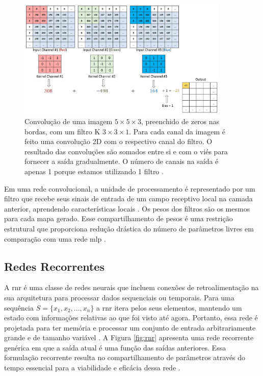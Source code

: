 \begin{figure}[h]
	\centering
	\includegraphics[width=0.9\textwidth]{figuras/conv3D.pdf}
	\caption[Convolução 2D em três mapa de recurso.]{Convolução de uma imagem  $5 \times 5 \times 3$, preenchido de zeros nas bordas, com um filtro K $3 \times 3 \times 1$. Para cada canal da imagem é feito uma convolução 2D com o respectivo canal do filtro. O resultado das convoluções são somados entre si e com o viés para fornecer a saída gradualmente.  O número de canais na saída é apenas 1 porque estamos utilizando 1 filtro \cite{sumit}.}
	\label{fig:con3d}
\end{figure}


Em uma rede convolucional, a unidade de processamento é representado por um filtro que recebe seus sinais de entrada de um campo receptivo local na camada anterior, aprendendo características locais \cite[272]{Haykin}. Os pesos dos filtros são os mesmos para cada mapa gerado. Esse compartilhamento de pesos é uma restrição estrutural que proporciona redução drástica do número de parâmetros livres em comparação com uma rede \acrshort{mlp} \cite[272]{Haykin}. 




\subsection{Redes Recorrentes}

A \gls{rnr} \cite{rumelhart1986learning} é uma classe de redes neurais que incluem conexões de retroalimentação na sua arquitetura para processar dados sequenciais ou temporais. Para uma sequência $S = \{x_1,x_2,...,x_n\}$ a \acrshort{rnr} itera pelos seus elementos, mantendo um estado com informações relativas ao que foi visto até agora. Portanto, essa rede é projetada para ter memória \cite{FrancoisDeepLearning} e processar um conjunto de entrada arbitrariamente grande e de tamanho variável \cite{ketkar2017deep}.
A Figura \ref{fig:rnr} apresenta uma rede recorrente genérica em que a saída atual é uma função das saídas anteriores.  Essa formulação recorrente resulta no compartilhamento de parâmetros através do tempo essencial para a viabilidade e eficácia dessa rede \cite{Goodfellow2016}.

